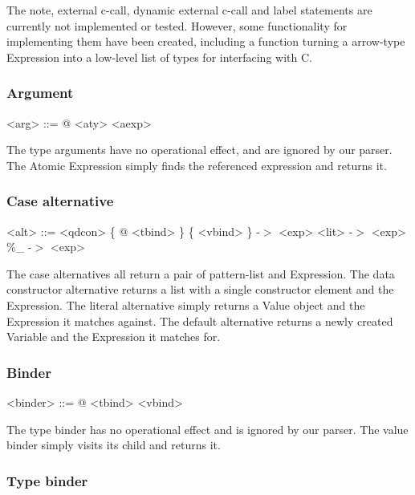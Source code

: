 The note, external c-call, dynamic external c-call and label statements are currently
not implemented or tested. However, some functionality for implementing them have been
created, including a function turning a arrow-type Expression into a low-level list
of types for interfacing with C.

\subsubsection{Argument}

\begin{grammar}
<arg> ::= @ <aty>
     \alt <aexp>
\end{grammar}

The type arguments have no operational effect, and are ignored by our parser.
The Atomic Expression simply finds the referenced expression and returns it.

\subsubsection{Case alternative}

\begin{grammar}
<alt> ::= <qdcon> \{ @ <tbind> \} \{ <vbind> \} -$>$ <exp>
     \alt <lit> -$>$ <exp>
     \alt \%\_ -$>$ <exp>
\end{grammar}

The case alternatives all return a pair of pattern-list and Expression. The
data constructor alternative returns a list with a single constructor element and
the Expression. The literal alternative simply returns a Value object and the 
Expression it matches against. The default alternative returns a newly created
Variable and the Expression it matches for.

\subsubsection{Binder}

\begin{grammar}
<binder> ::= @ <tbind>
        \alt <vbind>
\end{grammar}

The type binder has no operational effect and is ignored by our parser. The 
value binder simply visits its child and returns it.

\subsubsection{Type binder}


